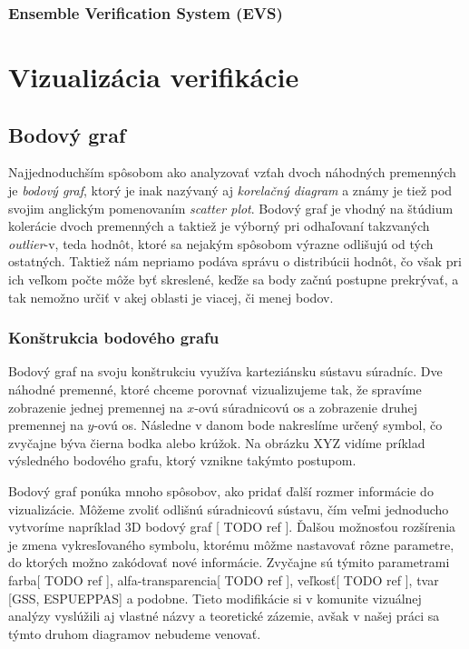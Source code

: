 \subsubsection[EVS]{Ensemble Verification System (EVS)}



\section{Vizualizácia verifikácie}

\subsection{Bodový graf}
Najjednoduchším spôsobom ako analyzovať vzťah dvoch náhodných premenných je \textit{bodový graf}, ktorý je inak nazývaný aj \textit{korelačný diagram} a známy je tiež pod svojim anglickým pomenovaním \textit{scatter plot}. Bodový graf je vhodný na štúdium kolerácie dvoch premenných a taktiež je výborný pri odhaľovaní takzvaných \textit{outlier}-v, teda hodnôt, ktoré sa nejakým spôsobom výrazne odlišujú od tých ostatných. Taktiež nám nepriamo podáva správu o distribúcii hodnôt, čo však pri ich veľkom počte môže byť skreslené, keďže sa body začnú postupne prekrývať, a tak nemožno určiť v akej oblasti je viacej, či menej bodov.


\subsubsection{Konštrukcia bodového grafu}
Bodový graf na svoju konštrukciu využíva karteziánsku sústavu súradníc. Dve náhodné premenné, ktoré chceme porovnať vizualizujeme tak, že spravíme zobrazenie jednej premennej na $ x $-ovú súradnicovú os a zobrazenie druhej premennej na $ y $-ovú os. Následne v danom bode nakreslíme určený symbol, čo zvyčajne býva čierna bodka alebo krúžok. 
Na obrázku XYZ vidíme príklad výsledného bodového grafu, ktorý vznikne takýmto postupom.

Bodový graf ponúka mnoho spôsobov, ako pridať ďalší rozmer informácie do vizualizácie. Môžeme zvoliť odlišnú súradnicovú sústavu, čím veľmi jednoducho vytvoríme napríklad 3D bodový graf [ TODO ref ]. Ďalšou možnosťou rozšírenia je zmena vykresľovaného symbolu, ktorému môžme nastavovať rôzne parametre, do ktorých možno zakódovať nové informácie. Zvyčajne sú týmito parametrami farba[ TODO ref ], alfa-transparencia[ TODO ref ], veľkosť[ TODO ref ], tvar [GSS, ESPUEPPAS] a podobne. Tieto modifikácie si v komunite vizuálnej analýzy vyslúžili aj vlastné názvy a teoretické zázemie, avšak v našej práci sa týmto druhom diagramov nebudeme venovať.

